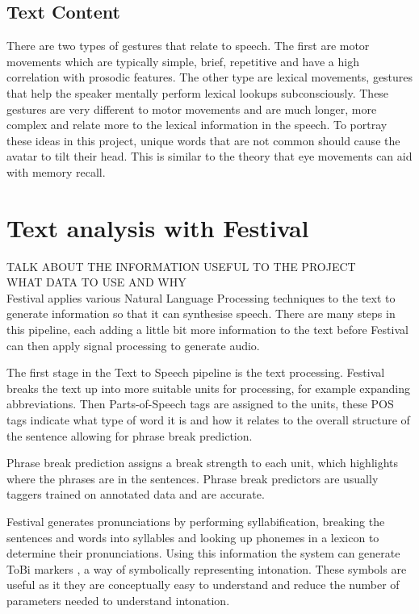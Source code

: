 \documentclass[bsc,frontabs,twoside,singlespacing,parskip]{infthesis}
\begin{document}
\subsection{Text Content}

There are two types of gestures that relate to speech. \cite{lexical_gestures} The first are motor movements which are typically simple, brief, repetitive and have a high correlation with prosodic features. The other type are lexical movements, gestures that help the speaker mentally perform lexical lookups subconsciously. These gestures are very different to motor movements and are much longer, more complex and relate more to the lexical information in the speech. To portray these ideas in this project, unique words that are not common should cause the avatar to tilt their head. This is similar to the theory that eye movements can aid with memory recall. \cite{eye_movements}

\section{Text analysis with Festival}
TALK ABOUT THE INFORMATION USEFUL TO THE PROJECT \\
WHAT DATA TO USE AND WHY\\


Festival applies various Natural Language Processing techniques to the text to generate information  so that it can synthesise speech.  There are many steps in this pipeline, each adding a little bit more information to the text before Festival can then apply signal processing to generate audio. 

The first stage in the Text to Speech pipeline is the text processing. Festival breaks the text up into more suitable units for processing, for example expanding abbreviations. Then Parts-of-Speech tags are assigned to the units, these POS tags indicate what type of word it is and how it relates to the overall structure of the sentence allowing for phrase break prediction.

Phrase break prediction assigns a break strength to each unit, which highlights where the phrases are in the sentences. Phrase break predictors are usually taggers trained on annotated data and are accurate.


Festival generates pronunciations by performing syllabification, breaking the sentences and words into syllables and looking up phonemes in a lexicon to determine their pronunciations. Using this information the system can generate ToBi markers \cite{tobi}, a way of symbolically representing intonation. These symbols are useful as it they are conceptually easy to understand and reduce the number of parameters needed to understand intonation.
\end{document}
